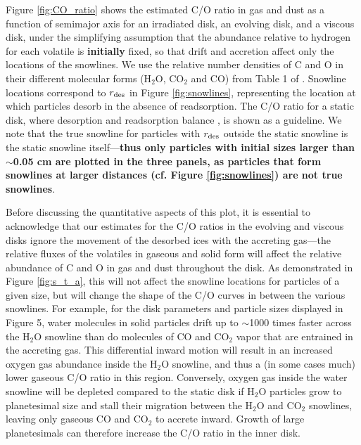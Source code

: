 \documentclass[apj]{emulateapj}
\begin{document}
Figure \ref{fig:CO_ratio} shows the estimated C/O ratio in gas and dust as a function of semimajor axis for an irradiated disk, an evolving disk, and a viscous disk, under the simplifying assumption that the abundance relative to hydrogen for each volatile is \textbf{initially} fixed, so that drift and accretion affect only the locations of the snowlines. We use the relative number densities of C and O in their different molecular forms (H$_2$O, CO$_2$ and CO) from Table 1 of \citet{oberg11}.  Snowline locations correspond to $r_{\rm des}$ in Figure \ref{fig:snowlines}, representing the location at which particles desorb in the absence of readsorption.  The C/O ratio for a static disk, where desorption and readsorption balance \citep{hollenbach09}, is shown as a guideline. We note that the true snowline for particles with $r_{\rm des}$ outside the static snowline is the static snowline itself---\textbf{thus only particles with initial sizes larger than $\sim$0.05 cm are plotted in the three panels, as particles that form snowlines at larger distances (cf. Figure \ref{fig:snowlines}) are not true snowlines}.


Before discussing the quantitative aspects of this plot, it is essential to acknowledge that our estimates for the C/O ratios in the evolving and viscous disks ignore the movement of the desorbed ices with the accreting gas---the relative fluxes of the volatiles in gaseous and solid form will affect the relative abundance of C and O in gas and dust throughout the disk. As demonstrated in Figure \ref{fig:s_t_a}, this will not affect the snowline locations for particles of a given size, but will change the shape of the C/O curves in between the various snowlines. For example, for the disk parameters and particle sizes displayed in Figure 5, water molecules in solid particles drift up to $\sim$1000 times faster across the H$_2$O snowline than do molecules of CO and CO$_2$ vapor that are entrained in the accreting gas.  This differential inward motion will result in an increased oxygen gas abundance inside the H$_2$O snowline, and thus a (in some cases much) lower gaseous C/O ratio in this region. Conversely, oxygen gas inside the water snowline will be depleted compared to the static disk if H$_2$O particles grow to planetesimal size and stall their migration between the H$_2$O and CO$_2$ snowlines, leaving only gaseous CO and CO$_2$ to accrete inward.  Growth of large planetesimals can therefore increase the C/O ratio in the inner disk.
\end{document}
